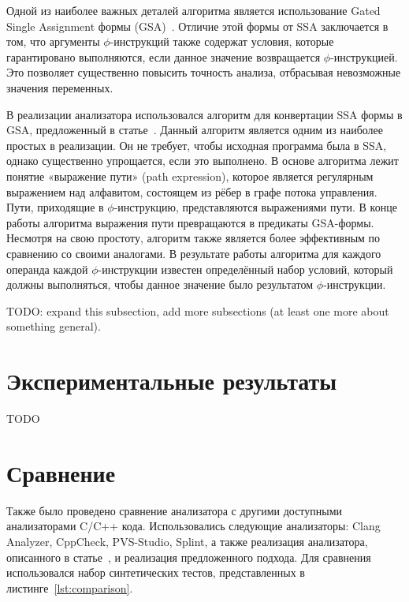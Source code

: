 Одной из наиболее важных деталей алгоритма является использование
Gated Single Assignment формы
(GSA)~\cite{ottenstein1990program}. Отличие этой формы от SSA
заключается в том, что аргументы $\phi$-инструкций также содержат
условия, которые гарантировано выполняются, если данное значение
возвращается $\phi$-инструкцией. Это позволяет существенно повысить
точность анализа, отбрасывая невозможные значения переменных.

В реализации анализатора использовался алгоритм для конвертации SSA
формы в GSA, предложенный в статье~\cite{tu1995efficient}. Данный
алгоритм является одним из наиболее простых в реализации. Он не
требует, чтобы исходная программа была в SSA, однако существенно
упрощается, если это выполнено. В основе алгоритма лежит понятие
«выражение пути» (path expression), которое является регулярным
выражением над алфавитом, состоящем из рёбер в графе потока
управления. Пути, приходящие в $\phi$-инструкцию, представляются
выражениями пути. В конце работы алгоритма выражения пути превращаются
в предикаты GSA-формы. Несмотря на свою простоту, алгоритм также
является более эффективным по сравнению со своими аналогами. В
результате работы алгоритма для каждого операнда каждой
$\phi$-инструкции известен определённый набор условий, который должны
выполняться, чтобы данное значение было результатом $\phi$-инструкции.

TODO: expand this subsection, add more subsections (at least one more
about something general).

\section{Экспериментальные результаты}

TODO

\section{Сравнение}

Также было проведено сравнение анализатора с другими доступными
анализаторами C/C++ кода. Использовались следующие анализаторы: Clang
Analyzer, CppCheck, PVS-Studio, Splint, а также реализация
анализатора, описанного в статье~\cite{li2010practical}, и реализация
предложенного подхода. Для сравнения использовался набор синтетических
тестов, представленных в листинге~\ref{lst:comparison}.

